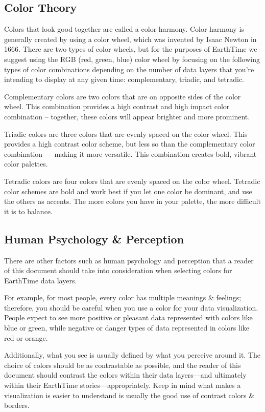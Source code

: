 \documentclass[
]{krantz}
\begin{document}
\hypertarget{color-theory}{%
\subsection*{Color Theory}\label{color-theory}}


Colors that look good together are called a color harmony. Color harmony is generally created by using a color wheel, which was invented by Isaac Newton in 1666. There are two types of color wheels, but for the purposes of EarthTime we suggest using the RGB (red, green, blue) color wheel by focusing on the following types of color combinations depending on the number of data layers that you're intending to display at any given time: complementary, triadic, and tetradic.

Complementary colors are two colors that are on opposite sides of the color wheel. This combination provides a high contrast and high impact color combination -- together, these colors will appear brighter and more prominent.

Triadic colors are three colors that are evenly spaced on the color wheel. This provides a high contrast color scheme, but less so than the complementary color combination --- making it more versatile. This combination creates bold, vibrant color palettes.

Tetradic colors are four colors that are evenly spaced on the color wheel. Tetradic color schemes are bold and work best if you let one color be dominant, and use the others as accents. The more colors you have in your palette, the more difficult it is to balance.

\hypertarget{human-psychology-perception}{%
\subsection*{Human Psychology \& Perception}\label{human-psychology-perception}}


There are other factors such as human psychology and perception that a reader of this document should take into consideration when selecting colors for EarthTime data layers.

For example, for most people, every color has multiple meanings \& feelings; therefore, you should be careful when you use a color for your data visualization. People expect to see more positive or pleasant data represented with colors like blue or green, while negative or danger types of data represented in colors like red or orange.

Additionally, what you see is usually defined by what you perceive around it. The choice of colors should be as contrastable as possible, and the reader of this document should contrast the colors within their data layers---and ultimately within their EarthTime stories---appropriately. Keep in mind what makes a visualization is easier to understand is usually the good use of contrast colors \& borders.
\end{document}
